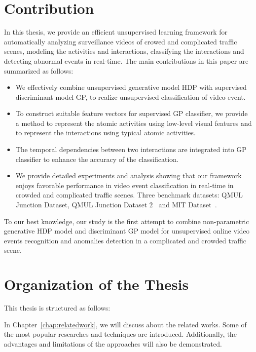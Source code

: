 \section{Contribution}
\label{contribution}


In this thesis, we provide an efficient unsupervised learning framework for automatically analyzing surveillance videos of crowed and complicated traffic scenes, modeling the activities and interactions, classifying the interactions and detecting abnormal events in real-time. 
The main contributions in this paper are summarized as follows: 
\begin{itemize}
	\item We effectively combine unsupervised generative model HDP with supervised discriminant model GP, to realize unsupervised classification of video event.
	\item To construct suitable feature vectors for supervised GP classifier, we provide a method to represent the atomic activities using low-level visual features and to represent the interactions using typical atomic activities.
	\item The temporal dependencies between two interactions are integrated into GP classifier to enhance the accuracy of the classification.
	\item We provide detailed experiments and analysis showing that our framework enjoys favorable performance in video event classification in real-time in crowded and complicated traffic scenes. Three benchmark datasets: QMUL Junction Dataset, QMUL Junction Dataset 2~\cite{hospedales2009markov} and MIT Dataset~\cite{wang2009unsupervised}.
\end{itemize}

To our best knowledge, our study is the first attempt to combine non-parametric generative HDP model and discriminant GP model for unsupervised online video events recognition and anomalies detection in a complicated and crowded traffic scene.
\section{Organization of the Thesis}
\label{outline}
This thesis is structured as follows:

In Chapter~\ref{chap:relatedwork}, we will discuss about the related works. Some of the most popular researches and techniques are introduced. Additionally, the advantages and limitations of the approaches will also be demonstrated.

